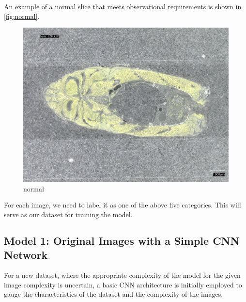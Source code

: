 An example of a normal slice that meets observational requirements is shown in \autoref{fig:normal}.

\begin{figure}[H]
    \centering
    \begin{minipage}{0.45\textwidth}
        \centering
        \includegraphics[width=\textwidth]{./fig/sample_1/normal.jpg}
        \caption{normal}
        \label{fig:normal}
    \end{minipage}
\end{figure}


For each image, we need to label it as one of the above five categories. This will serve as our dataset for training the model.


\FloatBarrier

\subsection{Model 1: Original Images with a Simple CNN Network}

For a new dataset, where the appropriate complexity of the model for the given image complexity is uncertain, a basic CNN architecture is initially employed to gauge the characteristics of the dataset and the complexity of the images.

